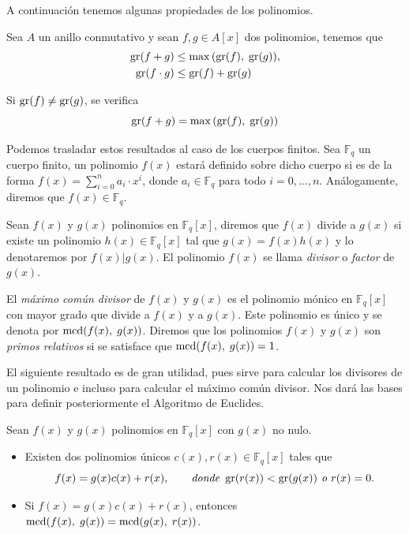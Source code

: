 A continuación tenemos algunas propiedades de los polinomios.

\begin{proposition}
    Sea $A$ un anillo conmutativo y sean $f,g \in A[x]$ dos polinomios, tenemos que 
    \begin{align*}
        \operatorname{gr}(f + g) &\leq \max{(\operatorname{gr}(f), \; \operatorname{gr}(g))},\\
        \operatorname{gr}(f \cdot g) &\leq \operatorname{gr}(f) + \operatorname{gr}(g)
    \end{align*}

    Si $\operatorname{gr}(f) \neq \operatorname{gr}(g)$, se verifica
    \[
        \operatorname{gr}(f + g) = \max{(\operatorname{gr}(f), \; \operatorname{gr}(g))}
    \]
\end{proposition}

Podemos trasladar estos resultados al caso de los cuerpos finitos. Sea $\mathbb{F}_q$ un cuerpo finito, un polinomio $f(x)$ estará definido sobre dicho cuerpo si es de la forma $f(x) = \sum_{i = 0}^{n} a_i \cdot x^i$, donde $a_i \in \mathbb{F}_q$ para todo $i = 0, ..., n$. Análogamente, diremos que $f(x) \in \mathbb{F}_q$.

Sean $f(x)$ y $g(x)$ polinomios en $\mathbb{F}_q[x]$, diremos que $f(x)$ divide a $g(x)$ si existe un polinomio $h(x) \in \mathbb{F}_q[x]$ tal que $g(x) = f(x) h(x)$ y lo denotaremos por $f(x) \vert g(x)$. El polinomio $f(x)$ se llama \emph{divisor} o \emph{factor} de $g(x)$.

El \emph{máximo común divisor} de $f(x)$ y $g(x)$ es el polinomio mónico en $\mathbb{F}_q[x]$ con mayor grado que divide a $f(x)$ y a $g(x)$. Este polinomio es único y se denota por $\operatorname{mcd}(f(x), \; g(x))$. Diremos que los polinomios $f(x)$ y $g(x)$ son \emph{primos relativos} si se satisface que $\operatorname{mcd}(f(x), \; g(x)) = 1$.

El siguiente resultado es de gran utilidad, pues sirve para calcular los divisores de un polinomio e incluso para calcular el máximo común divisor. Nos dará las bases para definir posteriormente el Algoritmo de Euclides.

\begin{theorem}
    \label{th:div_alg}
    Sean $f(x)$ y $g(x)$ polinomios en $\mathbb{F}_q[x]$ con $g(x)$ no nulo.
    \begin{itemize}
        \item Existen dos polinomios únicos $c(x), r(x) \in \mathbb{F}_q[x]$ tales que
        \[
            f(x) = g(x) c(x) + r(x), \qquad \textit{donde } \operatorname{gr}(r(x)) < \operatorname{gr}(g(x)) \textit{ o } r(x) = 0.
        \]
        \item Si $f(x) = g(x) c(x) + r(x)$, entonces $\operatorname{mcd}(f(x), \; g(x)) = \operatorname{mcd}(g(x), \; r(x))$.
    \end{itemize}
\end{theorem}

